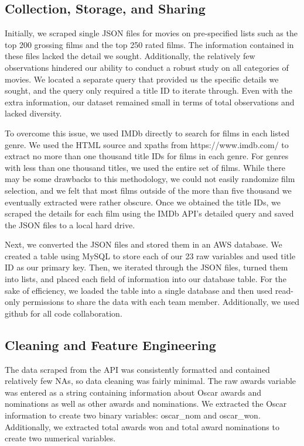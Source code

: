 \documentclass[10pt]{article}
\begin{document}
\subsection{Collection, Storage, and Sharing}

Initially, we scraped single JSON files for movies on pre-specified lists such as the top 200 grossing films and the top 250 rated films. The information contained in these files lacked the detail we sought. Additionally, the relatively few observations hindered our ability to conduct a robust study on all categories of movies. We located a separate query that provided us the specific details we sought, and the query only required a title ID to iterate through. Even with the extra information, our dataset remained small in terms of total observations and lacked diversity.

To overcome this issue, we used IMDb directly to search for films in each listed genre. We used the HTML source and xpaths from https://www.imdb.com/ to extract no more than one thousand title IDs for films in each genre. For genres with less than one thousand titles, we used the entire set of films. While there may be some drawbacks to this methodology, we could not easily randomize film selection, and we felt that most films outside of the more than five thousand we eventually extracted were rather obscure. Once we obtained the title IDs, we scraped the details for each film using the IMDb API’s detailed query and saved the JSON files to a local hard drive.

Next, we converted the JSON files and stored them in an AWS database. We created a table using MySQL to store each of our 23 raw variables and used title ID as our primary key. Then, we iterated through the JSON files, turned them into lists, and placed each field of information into our database table. For the sake of efficiency, we loaded the table into a single database and then used read-only permissions to share the data with each team member. Additionally, we used github for all code collaboration.


\subsection{Cleaning and Feature Engineering}

The data scraped from the API was consistently formatted and contained relatively few NAs, so data cleaning was fairly minimal. The raw awards variable was entered as a string containing information about Oscar awards and nominations as well as other awards and nominations. We extracted the Oscar information to create two binary variables: oscar\_nom and oscar\_won. Additionally, we extracted total awards won and total award nominations to create two numerical variables.
\end{document}
